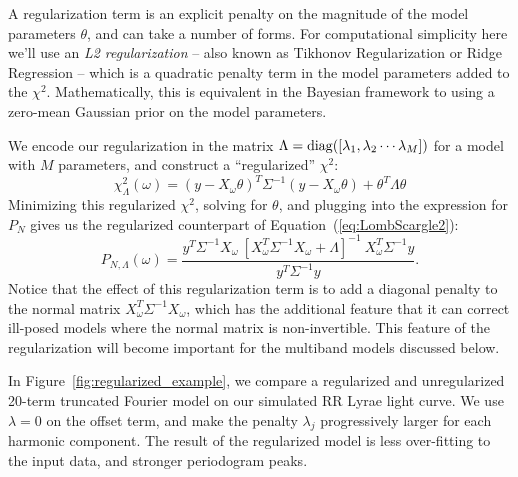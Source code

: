 \documentclass{emulateapj}
\newcommand{\Fig}[1]{Figure~\ref{fig:#1}}
\newcommand{\fig}[1]{\Fig{#1}}
\newcommand{\Eq}[1]{Equation~(\ref{eq:#1})}
\newcommand{\eq}[1]{\Eq{#1}}
\newcommand{\eqlabel}[1]{\label{eq:#1}}
\begin{document}
A regularization term is an explicit penalty on the magnitude of the model parameters $\theta$, and can take a number of forms. For computational simplicity here we'll use an {\it L2 regularization} -- also known as Tikhonov Regularization \citep{Tikhonov1963} or Ridge Regression \citep{Hoerl1970} -- which is a quadratic penalty term in the model parameters added to the $\chi^2$. Mathematically, this is equivalent in the Bayesian framework to using a zero-mean Gaussian prior on the model parameters.

We encode our regularization in the matrix $\Lambda = {\rm diag}([\lambda_1, \lambda_2 \cdots \lambda_M])$ for a model with $M$ parameters, and construct a ``regularized'' $\chi^2$:
\begin{equation}
  \eqlabel{chi2reg}
  \chi_\Lambda^2(\omega) = (y - X_\omega\theta)^T\Sigma^{-1}(y - X_\omega\theta) + \theta^T\Lambda\theta
\end{equation}
Minimizing this regularized $\chi^2$, solving for $\theta$, and plugging into the expression for $P_N$ gives us the regularized counterpart of \eq{LombScargle2}:
\begin{equation}
  \eqlabel{LombScargleReg}
  P_{N,\Lambda}(\omega) = \frac{y^T\Sigma^{-1}X_\omega~[X_\omega^T\Sigma^{-1}X_\omega + \Lambda]^{-1}~X_\omega^T\Sigma^{-1}y}{y^T\Sigma^{-1}y}.
\end{equation}
Notice that the effect of this regularization term is to add a diagonal penalty to the normal matrix $X_\omega^T\Sigma^{-1}X_\omega$, which has the additional feature that it can correct ill-posed models where the normal matrix is non-invertible. This feature of the regularization will become important for the multiband models discussed below.

In \fig{regularized_example}, we compare a regularized and unregularized 20-term truncated Fourier model on our simulated RR Lyrae light curve. We use $\lambda = 0$ on the offset term, and make the penalty $\lambda_j$ progressively larger for each harmonic component. The result of the regularized model is less over-fitting to the input data, and stronger periodogram peaks.
\end{document}
